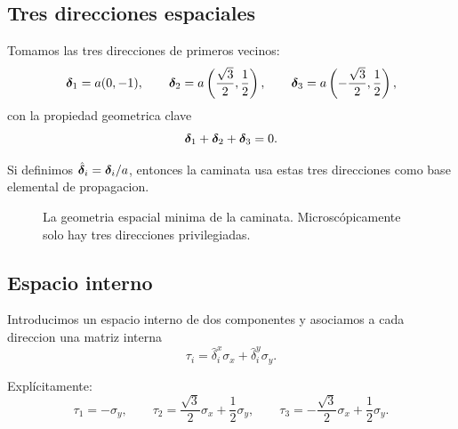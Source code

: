 \subsection{Tres direcciones espaciales}
Tomamos las tres direcciones de primeros vecinos:
\begin{equation}
\bm{\delta}_1 = a(0,-1),
\qquad
\bm{\delta}_2 = a\left(\frac{\sqrt{3}}{2},\frac{1}{2}\right),
\qquad
\bm{\delta}_3 = a\left(-\frac{\sqrt{3}}{2},\frac{1}{2}\right),
\label{c05:eq:deltas}
\end{equation}
con la propiedad geometrica clave
\begin{equation}
\bm{\delta}_1+\bm{\delta}_2+\bm{\delta}_3 = 0.
\label{c05:eq:sumzero}
\end{equation}

Si definimos \(\hat{\bm{\delta}}_i=\bm{\delta}_i/a\), entonces la caminata usa estas tres direcciones como base elemental de propagacion.

\begin{figure}[h!]
\centering
{}
\caption{La geometria espacial minima de la caminata. Microscópicamente solo hay tres direcciones privilegiadas.}
\end{figure}

\subsection{Espacio interno}
Introducimos un espacio interno de dos componentes y asociamos a cada direccion una matriz interna
\begin{equation}
\tau_i = \hat{\delta}_i^x \sigma_x + \hat{\delta}_i^y \sigma_y.
\label{c05:eq:taui}
\end{equation}

Explícitamente:
\begin{equation}
\tau_1 = -\sigma_y,
\qquad
\tau_2 = \frac{\sqrt{3}}{2}\sigma_x + \frac{1}{2}\sigma_y,
\qquad
\tau_3 = -\frac{\sqrt{3}}{2}\sigma_x + \frac{1}{2}\sigma_y.
\label{c05:eq:taus}
\end{equation}

